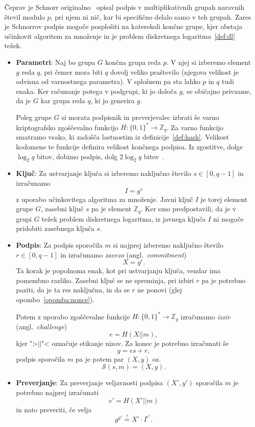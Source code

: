 \documentclass[isrm2, tisk]{fmfdelo}
\newcommand{\Z}{\mathbb Z}
\begin{document}
Čeprav je Schnorr originalno~\cite{schnorr1989sig} opisal podpis v multiplikativnih grupah naravnih
števil modulo $p$, pri njem ni nič, kar bi specifično delalo samo v teh grupah. Zares
je Schnorrov podpis mogoče posplošiti na katerekoli končne grupe, kjer obstaja učinkovit algoritem
za množenje in je problem diskretnega logaritma~\ref{def:dl} težek.
\begin{itemize}
    \item \textbf{Parametri}:
    Naj bo grupa $G$ končna grupa reda $p$. V njej si izberemo element $g$ reda $q$, pri čemer mora
    biti $q$ dovolj veliko praštevilo (njegova velikost je odvisna od varnostnega parametra).
    V splošnem pa sta lahko $p$ in $q$ tudi enaka. Ker računanje potega v podgrupi, ki jo določa $g$,
    se običajno privzame, da je $G$ kar grupa reda $q$, ki jo generira $g$.

    Poleg grupe $G$ si morata podpisnik in preverjevalec izbrati še varno kriptografsko zgoščevalno
    funkcijo $H : \{0, 1\}^* \rightarrow \Z_q$. Za varno funkcijo smatramo vsako, 
    ki zadošča lastnostim iz definicije~\ref{def:hash}. Velikost kodomene te funkcije definira velikost 
    končnega podpisa. Iz zgostitve, dolge $\log_2 q$ bitov, dobimo podpis, dolg $2 \log_2 q$ bitov~\cite{
    stinson2023crypto}.
    \item \textbf{Ključ}:
    Za ustvarjanje ključa si izberemo naključno število $s \in [0, q - 1]$ in izračunamo
    $$
    I = g^s
    $$
    z uporabo učinkovitega algoritma za množenje. Javni ključ $I$ je torej element grupe $G$, zasebni ključ
    $s$ pa je element $\Z_q$. Ker smo predpostavili, da je v grupi $G$ težek problem diskretnega logaritma,
    iz javnega ključa $I$ ni mogoče pridobiti zasebnega ključa $s$.

    \item \textbf{Podpis}:
    Za podpis sporočila $m$ si najprej izberemo naključno število $r \in [0, q - 1]$ in izračunamo
    \textit{zavezo} (angl.\ \textit{commitment})
    $$
    X = g^r.
    $$
    Ta korak je popolnoma enak, kot pri ustvarjanju ključa, vendar ima pomembno razliko. Zasebni
    ključ se ne spreminja, pri izbiri $r$ pa je potrebno paziti, da je ta res naključna, in da se
    $r$ ne ponovi (glej opombo~\ref{opomba:nonce}).

    Potem z uporabo zgoščevalne funkcije $H : \{0, 1\}^* \rightarrow \Z_q$ izračunamo \textit{izziv}
    (angl.\ \textit{challenge})
    $$
    e = H(X || m),
    $$
    kjer ">$||$"< označuje stikanje nizov. Za konec je potrebno izračunati še 
    $$ 
    y = es + r, 
    $$
    podpis sporočila $m$ pa je potem par $(X, y)$ oz.\ 
    $$ 
    \mathcal{S}(s, m) = (X, y).
    $$

    \item \textbf{Preverjanje}:
    Za preverjanje veljavnosti podpisa $(X', y')$ sporočila $m$ je potrebno najprej izračunati
    $$
    e' = H(X' || m)
    $$
    in nato preveriti, če velja
    $$
    g^{y'} \stackrel{?}{=} X' \cdot I^{e'}.
    $$
\end{itemize}
\end{document}
